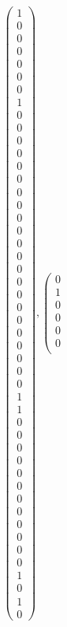 \documentclass[8pt]{article}
\begin{document}
 \begin{align*} \left(\begin{array}{r}
1 \\
0 \\
0 \\
0 \\
0 \\
0 \\
0 \\
1 \\
0 \\
0 \\
0 \\
0 \\
0 \\
0 \\
0 \\
0 \\
0 \\
0 \\
0 \\
0 \\
0 \\
0 \\
0 \\
0 \\
0 \\
0 \\
0 \\
0 \\
0 \\
0 \\
1 \\
1 \\
0 \\
0 \\
0 \\
0 \\
0 \\
0 \\
0 \\
0 \\
0 \\
0 \\
0 \\
0 \\
1 \\
0 \\
1 \\
0
\end{array}\right) ,
 \left(\begin{array}{r}
0 \\
1 \\
0 \\
0 \\
0 \\
0 \\

\end{array}
\end{align*}
\end{document}
